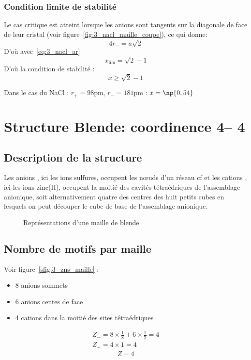 \subsubsection{Condition limite de stabilité}
Le cas critique est atteint lorsque les anions sont tangents sur la diagonale de face
de leur cristal (voir figure~\ref{fig:3_nacl_maille_coupe}), ce qui donne:
\begin{equation}
    4r_- = a\sqrt{2}
    \label{eq:3_limite_ar-}
\end{equation}
D'où avec~\ref{eq:3_nacl_ar}
\begin{equation}
    x_\text{lim} = \sqrt{2} - 1
\end{equation}
D'où la condition de stabilité :
\begin{equation}
    \boxed{x \geq \sqrt{2} - 1}
    \label{eq:3_stab_x}
\end{equation}

Dans le cas du NaCl : $r_+ = 98$pm, $r_- = 181$pm : $x = \np{0,54}$



\section{Structure Blende: coordinence 4\--- 4}
\subsection{Description de la structure}
Les anions , ici les ions sulfures, occupent les n\oe uds d'un réseau cf et les cations ,
ici les ions zinc(II), occupent la moitié des cavités tétraédriques
 de l’assemblage
anionique, soit alternativement quatre des centres des huit petits cubes en lesquels on peut
découper le cube de base de l’assemblage anionique.
\begin{figure}
    \centering
    \qquad
    \caption{Représentations d'une maille de blende}\label{fig:3_zns}
\end{figure}


\subsection{Nombre de motifs par maille}
Voir figure~\ref{sfig:3_zns_maille} :
\begin{itemize}
    \item 8 anions sommets
    \item 6 anions centes de face
    \item 4 cations dans la moitié des sites tétraédriques
\end{itemize}
\begin{gather*}
    Z_- = 8 \times \frac{1}{8} + 6 \times \frac{1}{2} = 4\\
    Z_+ = 4 \times 1 = 4
\end{gather*}
\begin{equation}
    Z = 4
\end{equation}



